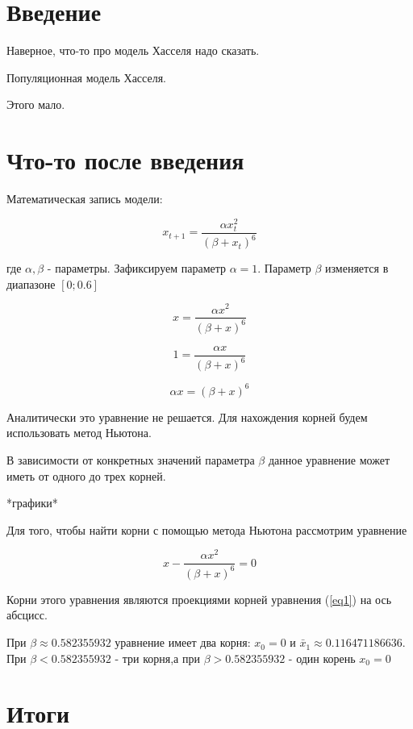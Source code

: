 \section{Введение}

    Наверное, что-то про модель Хасселя надо сказать.

    Популяционная модель Хасселя.

    Этого мало.

\section{Что-то после введения}

    Математическая запись модели:

    \[x_{t+1} = \frac{\alpha x_t^2}{(\beta + x_t)^6}\]

    где \(\alpha, \beta\) - параметры. Зафиксируем параметр \(\alpha = 1\). Параметр \(\beta\) изменяется в диапазоне \([0; 0.6]\)    

    \begin{equation}
        \label{eq1}
        x = \frac{\alpha x^2}{(\beta + x)^6}
    \end{equation}
    
    \[1 = \frac{\alpha x}{(\beta + x)^6}\]

    \[\alpha x = (\beta + x)^6\]

    Аналитически это уравнение не решается. Для нахождения корней будем использовать метод Ньютона.

    В зависимости от конкретных значений параметра \(\beta\) данное уравнение может иметь от одного до трех корней.
    
    *графики*

    Для того, чтобы найти корни с помощью метода Ньютона рассмотрим уравнение 
    
    \[x - \frac{\alpha x^2}{(\beta + x)^6} = 0\]

    Корни этого уравнения являются проекциями корней уравнения (\ref{eq1}) на ось абсцисс.

    При \(\beta \approx 0.582355932\) уравнение имеет два корня: \(x_0 = 0\) и \(\bar{x}_1 \approx 0.116471186636\). При \(\beta < 0.582355932\) - три корня,а при \(\beta > 0.582355932\) - один корень \(x_0 = 0\)   

\section{Итоги}